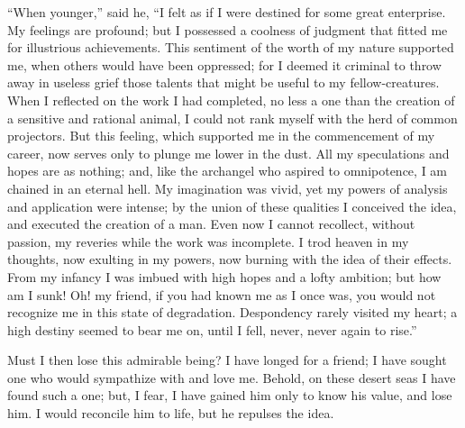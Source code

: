 ``When younger,'' said he, ``I felt
as if I were destined for some great enterprise.
My feelings are profound;
but I possessed a coolness of judgment
that fitted me for illustrious achievements.
This sentiment of the worth
of my nature supported me, when others
would have been oppressed; for I deemed
it criminal to throw away in useless
grief those talents that might be useful
to my fellow-creatures. When I reflected
on the work I had completed,
no less a one than the creation of a sensitive
and rational animal, I could not
rank myself with the herd of common
projectors. But this feeling, which supported
me in the commencement of my
career, now serves only to plunge me
lower in the dust. All my speculations
and hopes are as nothing; and, like the
archangel who aspired to omnipotence,
I am chained in an eternal hell. My
imagination was vivid, yet my powers of
analysis and application were intense; by
the union of these qualities I conceived
the idea, and executed the creation of
a man. Even now I cannot recollect,
without passion, my reveries while the
work was incomplete. I trod heaven
in my thoughts, now exulting in my
powers, now burning with the idea of
their effects. From my infancy I was
imbued with high hopes and a lofty
ambition; but how am I sunk! Oh!
my friend, if you had known me as I
once was, you would not recognize me
in this state of degradation. Despondency
rarely visited my heart; a high
destiny seemed to bear me on, until I
fell, never, never again to rise.''

Must I then lose this admirable
being? I have longed for a friend; I
have sought one who would sympathize
with and love me. Behold, on these
desert seas I have found such a one;
but, I fear, I have gained him only to
know his value, and lose him. I would
reconcile him to life, but he repulses
the idea.

